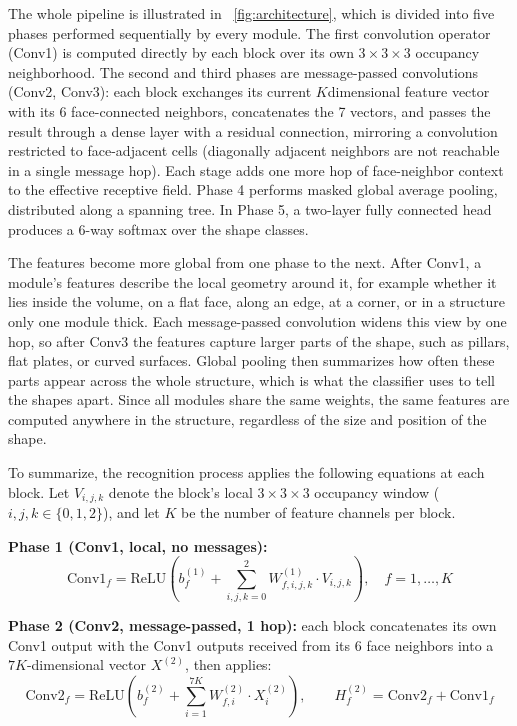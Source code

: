 \documentclass[12pt]{article}
\begin{document}
The whole pipeline is illustrated in \figurename~\ref{fig:architecture}, which is divided into five phases performed sequentially by every module. The first convolution operator (Conv1) is computed directly by each block over its own $3\times3\times3$ occupancy neighborhood. The second and third phases are message-passed convolutions (Conv2, Conv3): each block exchanges its current $K$\-dimensional feature vector with its 6 face-connected neighbors, concatenates the 7 vectors, and passes the result through a dense layer with a residual connection, mirroring a convolution restricted to face-adjacent cells (diagonally adjacent neighbors are not reachable in a single message hop). Each stage adds one more hop of face-neighbor context to the effective receptive field. Phase 4 performs masked global average pooling, distributed along a spanning tree. In Phase 5, a two-layer fully connected head produces a 6-way softmax over the shape classes.

The features become more global from one phase to the next. After Conv1, a module's features describe the local geometry around it, for example whether it lies inside the volume, on a flat face, along an edge, at a corner, or in a structure only one module thick. Each message-passed convolution widens this view by one hop, so after Conv3 the features capture larger parts of the shape, such as pillars, flat plates, or curved surfaces. Global pooling then summarizes how often these parts appear across the whole structure, which is what the classifier uses to tell the shapes apart. Since all modules share the same weights, the same features are computed anywhere in the structure, regardless of the size and position of the shape.



To summarize, the recognition process applies the following equations at each block. Let $V_{i,j,k}$ denote the block's local $3\times3\times3$ occupancy window ($i,j,k \in \{0,1,2\}$), and let $K$ be the number of feature channels per block.

\textbf{Phase 1 (Conv1, local, no messages):}
\begin{equation}
\text{Conv1}_f = \mathrm{ReLU}\left(b^{(1)}_f + \sum_{i,j,k=0}^{2} W^{(1)}_{f,i,j,k} \cdot V_{i,j,k}\right), \quad f = 1,\dots,K
\label{eq:conv1}
\end{equation}

\textbf{Phase 2 (Conv2, message-passed, 1 hop):} each block concatenates its own Conv1 output with the Conv1 outputs received from its 6 face neighbors into a $7K$-dimensional vector $X^{(2)}$, then applies:
\begin{equation}
\text{Conv2}_f = \mathrm{ReLU}\left(b^{(2)}_f + \sum_{i=1}^{7K} W^{(2)}_{f,i} \cdot X^{(2)}_i\right), \qquad H^{(2)}_f = \text{Conv2}_f + \text{Conv1}_f
\label{eq:conv2}
\end{equation}
\end{document}

